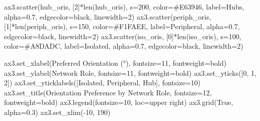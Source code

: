 \documentclass[
  11pt,
  letterpaper,
  oneside,
  openany]{book}
\newenvironment{Shaded}{\begin{snugshade}}{\end{snugshade}}
\newcommand{\BuiltInTok}[1]{\textcolor[rgb]{0.00,0.23,0.31}{#1}}
\newcommand{\DecValTok}[1]{\textcolor[rgb]{0.68,0.00,0.00}{#1}}
\newcommand{\FloatTok}[1]{\textcolor[rgb]{0.68,0.00,0.00}{#1}}
\newcommand{\NormalTok}[1]{\textcolor[rgb]{0.00,0.23,0.31}{#1}}
\newcommand{\OperatorTok}[1]{\textcolor[rgb]{0.37,0.37,0.37}{#1}}
\newcommand{\StringTok}[1]{\textcolor[rgb]{0.13,0.47,0.30}{#1}}
\newcommand{\VariableTok}[1]{\textcolor[rgb]{0.07,0.07,0.07}{#1}}
\begin{document}
\begin{Shaded}
\begin{Highlighting}[]
\NormalTok{ax3.scatter(hub\_oris, [}\DecValTok{2}\NormalTok{]}\OperatorTok{*}\BuiltInTok{len}\NormalTok{(hub\_oris), s}\OperatorTok{=}\DecValTok{200}\NormalTok{, color}\OperatorTok{=}\StringTok{\textquotesingle{}\#E63946\textquotesingle{}}\NormalTok{, }
\NormalTok{           label}\OperatorTok{=}\StringTok{\textquotesingle{}Hubs\textquotesingle{}}\NormalTok{, alpha}\OperatorTok{=}\FloatTok{0.7}\NormalTok{, edgecolor}\OperatorTok{=}\StringTok{\textquotesingle{}black\textquotesingle{}}\NormalTok{, linewidth}\OperatorTok{=}\DecValTok{2}\NormalTok{)}
\NormalTok{ax3.scatter(periph\_oris, [}\DecValTok{1}\NormalTok{]}\OperatorTok{*}\BuiltInTok{len}\NormalTok{(periph\_oris), s}\OperatorTok{=}\DecValTok{150}\NormalTok{, color}\OperatorTok{=}\StringTok{\textquotesingle{}\#F1FAEE\textquotesingle{}}\NormalTok{,}
\NormalTok{           label}\OperatorTok{=}\StringTok{\textquotesingle{}Peripheral\textquotesingle{}}\NormalTok{, alpha}\OperatorTok{=}\FloatTok{0.7}\NormalTok{, edgecolor}\OperatorTok{=}\StringTok{\textquotesingle{}black\textquotesingle{}}\NormalTok{, linewidth}\OperatorTok{=}\DecValTok{2}\NormalTok{)}
\NormalTok{ax3.scatter(iso\_oris, [}\DecValTok{0}\NormalTok{]}\OperatorTok{*}\BuiltInTok{len}\NormalTok{(iso\_oris), s}\OperatorTok{=}\DecValTok{100}\NormalTok{, color}\OperatorTok{=}\StringTok{\textquotesingle{}\#A8DADC\textquotesingle{}}\NormalTok{,}
\NormalTok{           label}\OperatorTok{=}\StringTok{\textquotesingle{}Isolated\textquotesingle{}}\NormalTok{, alpha}\OperatorTok{=}\FloatTok{0.7}\NormalTok{, edgecolor}\OperatorTok{=}\StringTok{\textquotesingle{}black\textquotesingle{}}\NormalTok{, linewidth}\OperatorTok{=}\DecValTok{2}\NormalTok{)}

\NormalTok{ax3.set\_xlabel(}\StringTok{\textquotesingle{}Preferred Orientation (°)\textquotesingle{}}\NormalTok{, fontsize}\OperatorTok{=}\DecValTok{11}\NormalTok{, fontweight}\OperatorTok{=}\StringTok{\textquotesingle{}bold\textquotesingle{}}\NormalTok{)}
\NormalTok{ax3.set\_ylabel(}\StringTok{\textquotesingle{}Network Role\textquotesingle{}}\NormalTok{, fontsize}\OperatorTok{=}\DecValTok{11}\NormalTok{, fontweight}\OperatorTok{=}\StringTok{\textquotesingle{}bold\textquotesingle{}}\NormalTok{)}
\NormalTok{ax3.set\_yticks([}\DecValTok{0}\NormalTok{, }\DecValTok{1}\NormalTok{, }\DecValTok{2}\NormalTok{])}
\NormalTok{ax3.set\_yticklabels([}\StringTok{\textquotesingle{}Isolated\textquotesingle{}}\NormalTok{, }\StringTok{\textquotesingle{}Peripheral\textquotesingle{}}\NormalTok{, }\StringTok{\textquotesingle{}Hub\textquotesingle{}}\NormalTok{], fontsize}\OperatorTok{=}\DecValTok{10}\NormalTok{)}
\NormalTok{ax3.set\_title(}\StringTok{\textquotesingle{}Orientation Preference by Network Role\textquotesingle{}}\NormalTok{, fontsize}\OperatorTok{=}\DecValTok{12}\NormalTok{, fontweight}\OperatorTok{=}\StringTok{\textquotesingle{}bold\textquotesingle{}}\NormalTok{)}
\NormalTok{ax3.legend(fontsize}\OperatorTok{=}\DecValTok{10}\NormalTok{, loc}\OperatorTok{=}\StringTok{\textquotesingle{}upper right\textquotesingle{}}\NormalTok{)}
\NormalTok{ax3.grid(}\VariableTok{True}\NormalTok{, alpha}\OperatorTok{=}\FloatTok{0.3}\NormalTok{)}
\NormalTok{ax3.set\_xlim(}\OperatorTok{{-}}\DecValTok{10}\NormalTok{, }\DecValTok{190}\NormalTok{)}


\end{Highlighting}
\end{Shaded}
\end{document}
